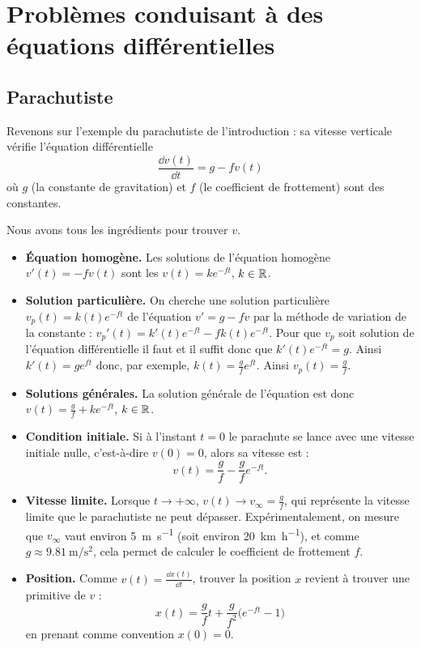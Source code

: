 \documentclass[class=report,crop=false]{standalone}
\begin{document}
\section{Problèmes conduisant à des équations différentielles}

\subsection{Parachutiste}


Revenons sur l'exemple du parachutiste de l'introduction :
sa vitesse verticale vérifie l'équation différentielle
$$\frac{\dd v(t)}{\dd t}= g - f v(t)$$
où $g$ (la constante de gravitation) et $f$ (le coefficient de frottement) sont des
constantes.


Nous avons tous les ingrédients pour trouver $v$.

\begin{itemize}
  \item \textbf{Équation homogène.}
  Les solutions de l'équation homogène $v'(t)=-fv(t)$ sont les $v(t)= ke^{-ft}$, $k\in\mathbb{R}$.

  \item \textbf{Solution particulière.}
  On cherche une solution particulière $v_p(t)=k(t)e^{-ft}$ de l'équation
  $v'= g - f v$ par la méthode de variation de la constante :
  $v_p'(t) = k'(t)  e^{-ft} -f k(t)e^{-ft}$. Pour que
  $v_p$ soit solution de l'équation différentielle il faut et il suffit donc que
  $k'(t)e^{-ft}=g$. Ainsi $k'(t)=ge^{ft}$ donc, par exemple, $k(t)=\frac{g}{f}e^{ft}$.
  Ainsi $v_p(t)=\frac{g}{f}$.

  \item \textbf{Solutions générales.}
  La solution générale de l'équation est donc $v(t)=\frac{g}{f}+k e^{-ft}$, $k\in\mathbb{R}$.

  \item \textbf{Condition initiale.}
  Si à l'instant $t=0$ le parachute se lance avec une vitesse initiale nulle, c'est-à-dire
  $v(0)=0$, alors sa vitesse est :
  $$v(t)=\frac{g}{f}-\frac{g}{f}e^{-ft}.$$


  \item \textbf{Vitesse limite.}
  Lorsque $t\to+\infty$, $v(t) \to v_\infty = \frac{g}{f}$, qui représente la vitesse limite
  que le parachutiste ne peut dépasser.
  Expérimentalement, on mesure que $v_\infty$ vaut environ \SI{5}{\meter\per\second}
  (soit environ \SI{20}{\kilo\meter\per\hour}), et comme $g \approx \SI{9.81}{\meter\per\second^2}$,
  cela permet de calculer le coefficient de frottement $f$.

  \item \textbf{Position.}
  Comme  $v(t) = \frac{\dd x(t)}{\dd t}$, trouver la position $x$ revient à trouver
  une primitive de $v$ :
  $$x(t) = \frac{g}{f} t + \frac{g}{f^2}\big(e^{-ft}-1\big)$$
  en prenant comme convention $x(0)=0$.
\end{itemize}
\end{document}
